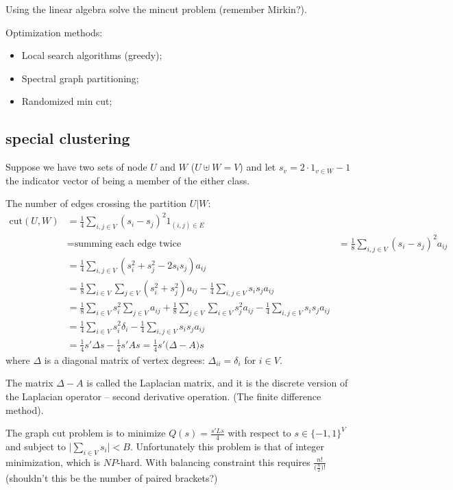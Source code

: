 \documentclass[a4paper]{article}
\begin{document}
Using the linear algebra solve the mincut problem (remember Mirkin?).

Optimization methods:
\begin{itemize}
	\item Local search algorithms (greedy);
	\item Spectral graph partitioning;
	\item Randomized min cut;
\end{itemize}


\subsection{special clustering} %
\label{sub:special_clustering}

Suppose we have two sets of node $U$ and $W$ ($U\uplus W = V$) and let $s_v = 2\cdot1_{v\in W}-1$ the indicator vector of being a member of the either class.

The number of edges crossing the partition $U\vert W$:
\begin{align*}
	\text{cut}(U,W)
	&= \frac{1}{4}\sum_{i,j\in V} (s_i - s_j)^2 1_{(i,j)\in E} \\
	&= \text{summing each edge twice}
	&= \frac{1}{8}\sum_{i,j\in V} (s_i - s_j)^2 a_{ij} \\
	&= \frac{1}{4}\sum_{i,j\in V} (s_i^2 + s_j^2 - 2s_i s_j) a_{ij} \\
	&= \frac{1}{8}\sum_{i\in V} \sum_{j\in V} (s_i^2 + s_j^2) a_{ij} - \frac{1}{4}\sum_{i,j\in V} s_i s_j a_{ij} \\
	&= \frac{1}{8}\sum_{i\in V} s_i^2 \sum_{j\in V} a_{ij} + \frac{1}{8}\sum_{j\in V} \sum_{i\in V} s_j^2 a_{ij} - \frac{1}{4} \sum_{i,j\in V} s_i s_j a_{ij} \\ 
	&= \frac{1}{4}\sum_{i\in V} s_i^2 \delta_i - \frac{1}{4} \sum_{i,j\in V} s_i s_j a_{ij} \\
	&= \frac{1}{4} s'\Delta s - \frac{1}{4} s'As = \frac{1}{4} s'\big(\Delta - A \big)s
\end{align*}
where $\Delta$ is a diagonal matrix of vertex degrees: $\Delta_{ii} = \delta_i$ for $i\in V$.

The matrix $\Delta-A$ is called the Laplacian matrix, and it is the discrete version of the Laplacian operator -- second derivative operation. (The finite difference method).

The graph cut problem is to minimize $Q(s) = \frac{s'Ls}{4}$ with respect to $s\in \{-1,1\}^V$ and subject to $\big \lvert \sum_{i\in V}s_i \big\rvert < B$. Unfortunately this problem is that of integer minimization, which is $NP$-hard. With balancing constraint this requires $\frac{n!}{\big(\frac{n}{2}\big)!}$ (shouldn't this be the number of paired brackets?)
\end{document}
